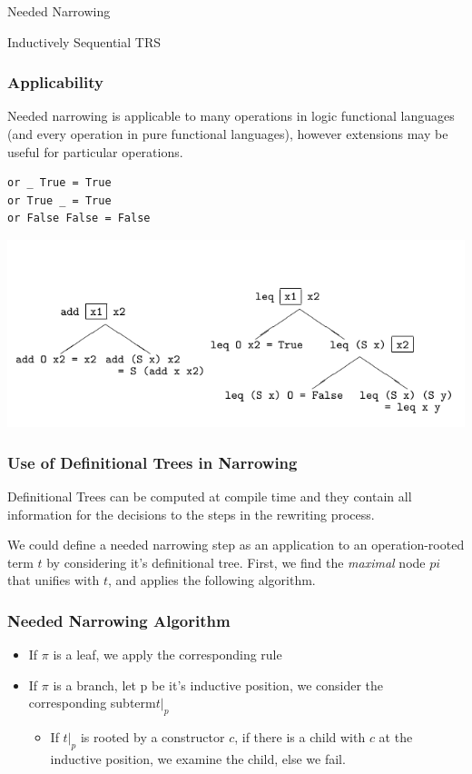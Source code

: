 \documentclass{beamer}
\begin{document}
\begin{section}{Needed Narrowing}
\begin{subsection}{Inductively Sequential TRS}
\begin{frame}
[fragile]

\frametitle{Applicability}
Needed narrowing is applicable to many operations in logic functional languages (and every operation in pure functional languages), however extensions may be useful for particular operations.

\begin{example}
\begin{verbatim}
or _ True = True
or True _ = True
or False False = False
\end{verbatim}
\end{example}
\end{frame}

\begin{frame}

\includegraphics[scale=0.5]{pictures/def_trees.png}
  
\end{frame}

\begin{frame}
\frametitle{Use of Definitional Trees in Narrowing}

  Definitional Trees can be computed at compile time and they contain all information for the decisions to the steps in the rewriting process.

  We could define a needed narrowing step as an application to an operation-rooted term $t$ by considering it's definitional tree. First, we find the \textit{maximal} node $pi$ that unifies with $t$, and applies the following algorithm.

\end{frame}

\begin{frame}
\frametitle{Needed Narrowing Algorithm}
  \begin{itemize}
\item If $\pi$ is a leaf, we apply the corresponding rule
\item If $\pi$ is a branch, let p be it's inductive position, we consider the corresponding subterm$t|_p$
  \begin{itemize}
  \item If $t|_p$ is rooted by a constructor $c$, if there is a child  with $c$ at the inductive position, we examine the child, else we fail.


\end{itemize}
\end{itemize}
\end{frame}
\end{subsection}
\end{section}
\end{document}
